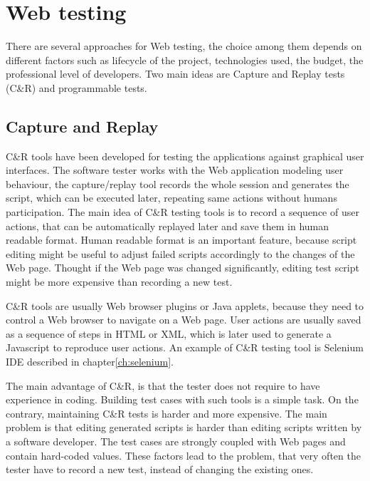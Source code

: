 	\chapter{Web testing}
	\label{ch:Webtesting}

		There are several approaches for Web testing, the choice among them depends on
		different factors such as lifecycle of the project, technologies used, the
		budget, the professional level of developers. Two main ideas are Capture and
		Replay tests (C\&R) and programmable tests.
		
		\section{Capture and Replay}
		\label{sec:captureReplay}
			C\&R tools have been developed for testing the applications against graphical user interfaces. 
			The software tester works with the Web application modeling user behaviour,
			the capture/replay tool records the whole session and generates the script,
			 which can be executed later,	repeating same actions without humans participation.
			  The main idea of C\&R
			testing tools is to record a sequence of user actions, that can be
			automatically replayed later and save them in human readable format. Human
			readable format is an important feature, because script editing might
			 be useful to adjust failed scripts accordingly	to the changes of the Web page.
			 Thought if the Web page was changed
			significantly, editing test script might be more expensive than recording a
			new test\cite{CaptureReplay7}. 
			
C\&R tools are usually Web browser plugins or Java applets, because they
need to control a Web browser to navigate on a Web page. User actions are
usually saved as a sequence of steps in HTML or XML, which is later used to
generate a Javascript to reproduce user actions. An example of C\&R testing
tool is Selenium IDE described in chapter\ref{ch:selenium}.

The main advantage of C\&R, is that the tester does not
require to have experience in coding. Building test cases with such tools
is a simple task.
On the contrary, maintaining C\&R tests is harder and more
expensive\cite{CaptureReplay7}.
The main problem is that editing generated scripts is harder than editing
scripts written by a software developer. The test cases are strongly coupled
with Web pages and contain hard-coded values. These factors lead to the
problem, that very often the tester have to record a new test, instead of
changing the existing ones.

